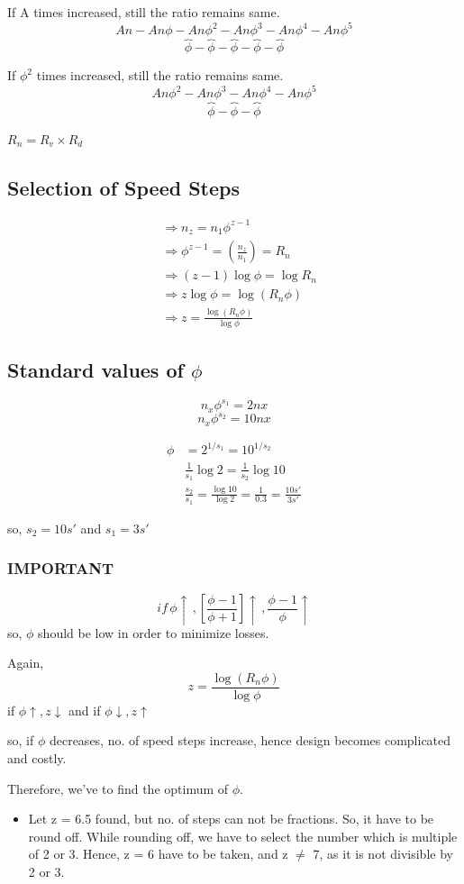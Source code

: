 \documentclass{article}
\begin{document}
If A times increased, still the ratio remains same. 
$$An - An\phi - An\phi^2 - An\phi^3 - An\phi^4 - An\phi^5$$
$$\overbrace{\phi} - \overbrace{\phi} - \overbrace{\phi} - \overbrace{\phi} - \overbrace{\phi}$$

If $\phi^2$ times increased, still the ratio remains same. 
$$An\phi^2 - An\phi^3 - An\phi^4 - An\phi^5$$
$$\overbrace{\phi} - \overbrace{\phi} - \overbrace{\phi} $$

$R_n = R_v \times R_d$

\subsection*{Selection of Speed Steps}
\begin{align*}
  &\Rightarrow n_z = n_1 \phi^{z-1} \\
  &\Rightarrow \phi^{z-1} = \left(\frac{n_z}{n_1}\right) = R_n \\
  &\Rightarrow (z-1) \log \phi = \log R_n \\
  &\Rightarrow z \log \phi = \log \left(R_n \phi\right) \\
  &\Rightarrow z = \frac{\log \left(R_n \phi\right)}{\log \phi} 
\end{align*}

\subsection*{Standard values of $\phi$}
$$n_x \phi^{s_1} = 2nx$$
$$n_x \phi^{s_2} = 10nx$$

\begin{align*}
  \phi &= 2^{1/s_1} = 10^{1/s_2} \\
  &\frac{1}{s_1} \log 2 = \frac{1}{s_2} \log 10 \\
  &\frac{s_2}{s_1} = \frac{\log 10}{\log 2} = \frac{1}{0.3} = \frac{10 s'}{3s'}  
\end{align*}

so, $s_2 = 10s'$ and $s_1 = 3s'$ 
\subsubsection*{IMPORTANT}
$$if \, \phi \uparrow \, , \left[\frac{\phi - 1}{\phi + 1}\right] \uparrow \, , \frac{\phi -1}{\phi} \uparrow $$ 
so, $\phi$ should be low in order to minimize losses. 

Again, $$z = \frac{\log \left(R_n \phi\right)}{\log \phi}$$
if $\phi \uparrow , z \downarrow $ and if $\phi \downarrow , z \uparrow $

so, if $\phi$ decreases, no. of speed steps increase, hence design becomes complicated and costly.

Therefore, we've to find the optimum of $\phi$. 

\begin{itemize}
  \item Let z = 6.5 found, but no. of steps can not be fractions. So, it have to be round off. While rounding off, we have to select the number which is multiple of 2 or 3. Hence, z = 6 have to be taken, and z $\neq$ 7, as it is not divisible by 2 or 3. 
\end{itemize}
\end{document}
